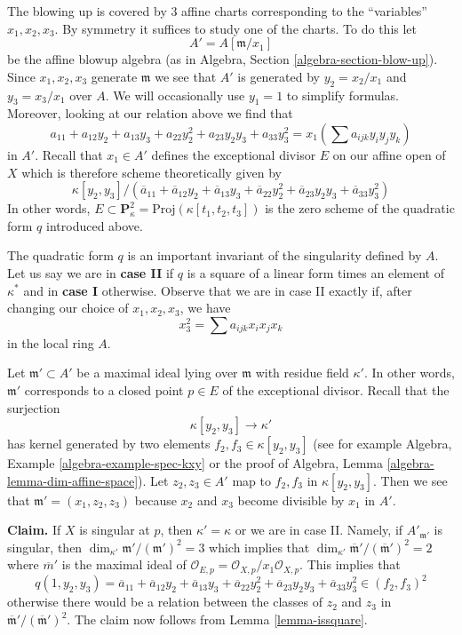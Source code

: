 \medskip\noindent
The blowing up is covered by $3$ affine charts corresponding to
the ``variables'' $x_1, x_2, x_3$. By symmetry it suffices to study
one of the charts. To do this let
$$
A' = A[\mathfrak m/x_1]
$$
be the affine blowup algebra (as in
Algebra, Section \ref{algebra-section-blow-up}).
Since $x_1, x_2, x_3$ generate $\mathfrak m$ we see that $A'$
is generated by $y_2 = x_2/x_1$ and $y_3 = x_3/x_1$ over $A$.
We will occasionally use $y_1 = 1$ to simplify formulas.
Moreover, looking at our relation above we find that
$$
a_{11} + a_{12} y_2 + a_{13} y_3 + a_{22} y_2^2 +
a_{23} y_2y_3 + a_{33} y_3^2 =
x_1 (\sum a_{ijk} y_iy_jy_k)
$$
in $A'$. Recall that $x_1 \in A'$ defines the exceptional divisor $E$
on our affine open of $X$
which is therefore scheme theoretically given by
$$
\kappa[y_2, y_3]/
(\overline{a}_{11} + \overline{a}_{12} y_2 + \overline{a}_{13} y_3 +
\overline{a}_{22} y_2^2 + \overline{a}_{23} y_2y_3 + \overline{a}_{33} y_3^2)
$$
In other words,
$E \subset \mathbf{P}^2_\kappa = \text{Proj}(\kappa[t_1, t_2, t_3])$ is
the zero scheme of the quadratic form $q$ introduced above.

\medskip\noindent
The quadratic form $q$ is an important invariant of the singularity
defined by $A$. Let us say we are in
{\bf case II} if $q$ is a square of a linear form times
an element of $\kappa^*$ and in {\bf case I} otherwise.
Observe that we are in case II exactly if, after
changing our choice of $x_1, x_2, x_3$, we have
$$
x_3^2 = \sum a_{ijk}x_ix_jx_k
$$
in the local ring $A$.

\medskip\noindent
Let $\mathfrak m' \subset A'$ be a maximal ideal lying over $\mathfrak m$
with residue field $\kappa'$. In other words, $\mathfrak m'$ corresponds
to a closed point $p \in E$ of the exceptional divisor. Recall that the
surjection
$$
\kappa[y_2, y_3] \to \kappa'
$$
has kernel generated by two elements $f_2, f_3 \in \kappa[y_2, y_3]$
(see for example Algebra, Example \ref{algebra-example-spec-kxy}
or the proof of
Algebra, Lemma \ref{algebra-lemma-dim-affine-space}).
Let $z_2, z_3 \in A'$ map to $f_2, f_3$ in $\kappa[y_2, y_3]$.
Then we see that $\mathfrak m' = (x_1, z_2, z_3)$ because
$x_2$ and $x_3$ become divisible by $x_1$ in $A'$.

\medskip\noindent
{\bf Claim.} If $X$ is singular at $p$, then $\kappa' = \kappa$ or we are
in case II. Namely, if $A'_{\mathfrak m'}$
is singular, then $\dim_{\kappa'} \mathfrak m'/(\mathfrak m')^2 = 3$
which implies that
$\dim_{\kappa'} \overline{\mathfrak m}'/(\overline{\mathfrak m}')^2 = 2$
where $\overline{m}'$ is the maximal ideal of
$\mathcal{O}_{E, p} = \mathcal{O}_{X, p}/x_1\mathcal{O}_{X, p}$.
This implies that
$$
q(1, y_2, y_3) =
\overline{a}_{11} + \overline{a}_{12} y_2 + \overline{a}_{13} y_3 +
\overline{a}_{22} y_2^2 + \overline{a}_{23} y_2y_3 + \overline{a}_{33} y_3^2
\in (f_2, f_3)^2
$$
otherwise there would be a relation between the classes of $z_2$
and $z_3$ in $\overline{\mathfrak m}'/(\overline{\mathfrak m}')^2$.
The claim now follows from Lemma \ref{lemma-issquare}.

